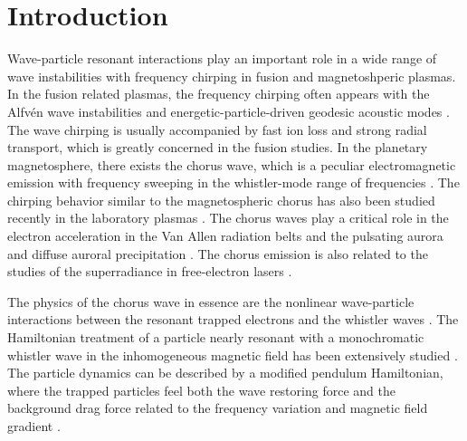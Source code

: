 \section{Introduction}
\label{sec:intro}
Wave-particle resonant interactions play an important role  in a wide range of wave instabilities
with frequency chirping in fusion and magnetoshperic plasmas.
In the fusion related plasmas, the frequency chirping often appears with the Alfv\'en wave instabilities \cite{chen2016,wang2018,wang2012,wang2012a} and energetic-particle-driven geodesic acoustic modes \cite{wang2013}.
The wave chirping is usually accompanied by fast ion loss and strong radial transport, which is greatly concerned in the fusion studies.
In the planetary magnetosphere, there exists the chorus wave, which is a peculiar electromagnetic emission with frequency sweeping in the whistler-mode range of frequencies \cite{helliwell1965whistlers,burtis_magnetospheric_1976,tsurutani_postmidnight_1974}. 
The chirping behavior similar to the magnetospheric chorus has also been studied recently in the laboratory plasmas \cite{vancompernolle2015,saitoh2024}.
The chorus waves  play a critical role in the electron acceleration   in the Van Allen radiation belts \cite{horne_wave_2005,thorne_rapid_2013,reeves_electron_2013} and the pulsating aurora  and diffuse auroral precipitation \cite{nishimura_identifying_2010,kasahara_pulsating_2018,thorne_scattering_2010}.
The chorus emission is also related to 
 the studies of the superradiance in free-electron lasers \cite{zonca_nonlinear_2021, soto-chavez2012}.

The physics of the chorus wave in essence are the nonlinear wave-particle interactions \cite{oneil1971,oneil1972} between the resonant trapped electrons and the whistler waves \cite{omura_theory_2008, an2019}.
The Hamiltonian treatment of a particle nearly resonant with a monochromatic whistler wave in the inhomogeneous magnetic field has been extensively studied \cite{albert1993,albert2021}.
The particle dynamics can be described by a modified pendulum Hamiltonian, where the trapped particles feel both the wave restoring force and the background drag force related to the frequency variation and magnetic field gradient \cite{zheng2024,tao_trap-release-amplify_2021}.

